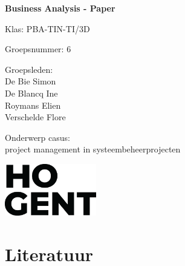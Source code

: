 \documentclass{article}
\begin{document}
    
    \begin{titlepage}
        \centering
        \vspace*{2cm}
        
        {\Huge \textbf{Business Analysis - Paper}}\\
        \vspace{1.5cm}
        
        {\Large Klas:  PBA-TIN-TI/3D}\\
        \vspace{0.5cm}
        
        {\Large Groepsnummer: 6}\\
        \vspace{0.5cm}
        
        {\Large Groepsleden: \\
            De Bie Simon\\
            De Blancq Ine\\
            Roymans Elien\\[0.15cm]
            Verschelde Flore}\\
        \vspace{1.0cm}
        
        {\Large Onderwerp casus:\\ project management in systeembeheerprojecten}\\
        
        \vfill
        
        \begin{flushright}
            \includegraphics[width=0.3\textwidth]{logo.png}
        \end{flushright}
    \end{titlepage}
    \tableofcontents
    \section{Literatuur}
\end{document}
